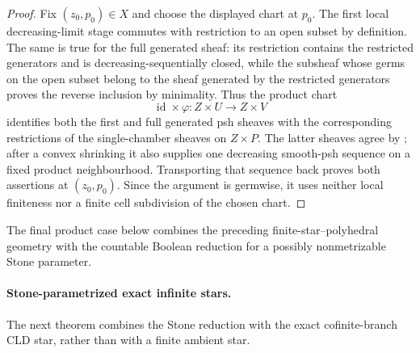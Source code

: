 \begin{proof}
Fix $(z_0,p_0)\in X$ and choose the displayed chart at $p_0$.  The
first local decreasing-limit stage commutes with restriction to an open
subset by definition.  The same is true for the full generated sheaf: its
restriction contains the restricted generators and is decreasing-sequentially
closed, while the subsheaf whose germs on the open subset belong to the
sheaf generated by the restricted generators proves the reverse inclusion by
minimality.  Thus the product chart
\[
             \operatorname{id}\times\varphi:Z\times U\longrightarrow Z\times V
\]
identifies both the first and full generated psh sheaves with the
corresponding restrictions of the single-chamber sheaves on $Z\times P$.
The latter sheaves agree by ; after
a convex shrinking it also supplies one decreasing smooth-psh sequence on a
fixed product neighbourhood.  Transporting that sequence back proves both
assertions at $(z_0,p_0)$.  Since the argument is germwise, it uses
neither local finiteness nor a finite cell subdivision of the chosen chart.
\end{proof}






The final product case below combines the preceding finite-star--polyhedral
geometry with the countable Boolean reduction for a possibly nonmetrizable
Stone parameter.




\paragraph{Stone-parametrized exact infinite stars.}
The next theorem combines the Stone reduction with the exact
cofinite-branch CLD star, rather than with a finite ambient star.




